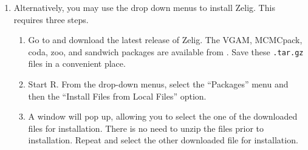\documentclass{article}
\begin{document}
\begin{enumerate}
\begin{enumerate}
  \item Alternatively, you may use the drop down menus to install
    Zelig.  This requires three steps.  
  \begin{enumerate} 
  \item Go to  and 
    download the latest release of Zelig.  The VGAM, MCMCpack,
coda, zoo, and sandwich packages are available from
.
Save these \texttt{.tar.gz} files in a convenient place.
  \item Start R.  From the drop-down menus, select the ``Packages''
    menu and then the ``Install Files from Local Files'' option.
  \item A window will pop up, allowing you to select the one of the
    downloaded files for installation.  There is no need to unzip
    the files prior to installation.  Repeat and select the other
    downloaded file for installation.
  \end{enumerate} 
  
\end{enumerate}


\end{enumerate}
\end{document}
